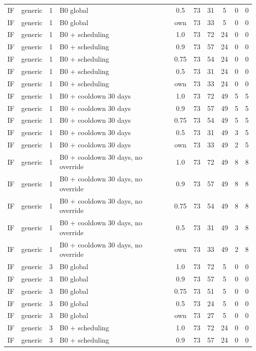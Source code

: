 \documentclass[10pt,onecolumn,letterpaper]{article}
\begin{document}
\begin{longtable}{lllp{4.4cm}cccccc}
IF & generic & 1 & B0 global & 0.5 & 73 & 31 & 5 & 0 & 0 \\
IF & generic & 1 & B0 global & own & 73 & 33 & 5 & 0 & 0 \\
IF & generic & 1 & B0 + scheduling & 1.0 & 73 & 72 & 24 & 0 & 0 \\
IF & generic & 1 & B0 + scheduling & 0.9 & 73 & 57 & 24 & 0 & 0 \\
IF & generic & 1 & B0 + scheduling & 0.75 & 73 & 54 & 24 & 0 & 0 \\
IF & generic & 1 & B0 + scheduling & 0.5 & 73 & 31 & 24 & 0 & 0 \\
IF & generic & 1 & B0 + scheduling & own & 73 & 33 & 24 & 0 & 0 \\
IF & generic & 1 & B0 + cooldown 30 days & 1.0 & 73 & 72 & 49 & 5 & 5 \\
IF & generic & 1 & B0 + cooldown 30 days & 0.9 & 73 & 57 & 49 & 5 & 5 \\
IF & generic & 1 & B0 + cooldown 30 days & 0.75 & 73 & 54 & 49 & 5 & 5 \\
IF & generic & 1 & B0 + cooldown 30 days & 0.5 & 73 & 31 & 49 & 3 & 5 \\
IF & generic & 1 & B0 + cooldown 30 days & own & 73 & 33 & 49 & 2 & 5 \\
IF & generic & 1 & B0 + cooldown 30 days, no override & 1.0 & 73 & 72 & 49 & 8 & 8 \\
IF & generic & 1 & B0 + cooldown 30 days, no override & 0.9 & 73 & 57 & 49 & 8 & 8 \\
IF & generic & 1 & B0 + cooldown 30 days, no override & 0.75 & 73 & 54 & 49 & 8 & 8 \\
IF & generic & 1 & B0 + cooldown 30 days, no override & 0.5 & 73 & 31 & 49 & 3 & 8 \\
IF & generic & 1 & B0 + cooldown 30 days, no override & own & 73 & 33 & 49 & 2 & 8 \\
IF & generic & 3 & B0 global & 1.0 & 73 & 72 & 5 & 0 & 0 \\
IF & generic & 3 & B0 global & 0.9 & 73 & 57 & 5 & 0 & 0 \\
IF & generic & 3 & B0 global & 0.75 & 73 & 51 & 5 & 0 & 0 \\
IF & generic & 3 & B0 global & 0.5 & 73 & 24 & 5 & 0 & 0 \\
IF & generic & 3 & B0 global & own & 73 & 27 & 5 & 0 & 0 \\
IF & generic & 3 & B0 + scheduling & 1.0 & 73 & 72 & 24 & 0 & 0 \\
IF & generic & 3 & B0 + scheduling & 0.9 & 73 & 57 & 24 & 0 & 0 \\

\end{longtable}
\end{document}
